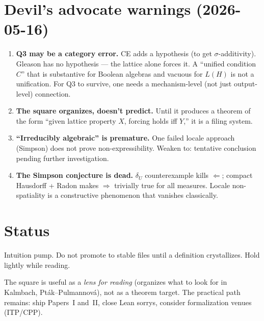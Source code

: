 \documentclass[11pt]{article}
\begin{document}
\section*{Devil's advocate warnings (2026-05-16)}

\begin{enumerate}[nosep]
  \item \textbf{Q3 may be a category error.}  CE adds a hypothesis
    (to get $\sigma$-additivity).  Gleason has no hypothesis --- the
    lattice alone forces it.  A ``unified condition $C$'' that is
    substantive for Boolean algebras and vacuous for $L(H)$ is not
    a unification.  For Q3 to survive, one needs a mechanism-level
    (not just output-level) connection.
  \item \textbf{The square organizes, doesn't predict.}  Until it
    produces a theorem of the form ``given lattice property $X$,
    forcing holds iff $Y$,'' it is a filing system.
  \item \textbf{``Irreducibly algebraic'' is premature.}  One failed
    locale approach (Simpson) does not prove non-expressibility.
    Weaken to: tentative conclusion pending further investigation.
  \item \textbf{The Simpson conjecture is dead.}  $\delta_U$
    counterexample kills $\Leftarrow$; compact Hausdorff + Radon
    makes $\Rightarrow$ trivially true for all measures.  Locale
    non-spatiality is a constructive phenomenon that vanishes
    classically.
\end{enumerate}

\section*{Status}

Intuition pump.  Do not promote to stable files until a definition
crystallizes.  Hold lightly while reading.

The square is useful as a \emph{lens for reading} (organizes what to
look for in Kalmbach, Pt\'{a}k--Pulmannov\'{a}), not as a theorem
target.  The practical path remains: ship Papers~I and~II, close
Lean sorrys, consider formalization venues (ITP/CPP).
\end{document}
